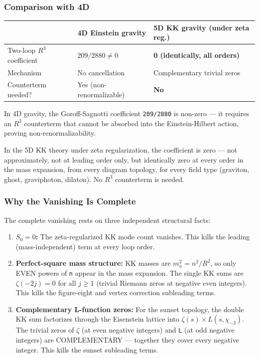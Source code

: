 \documentclass[aps,prd,preprint,superscriptaddress,longbibliography,floatfix]{revtex4-2}
\theoremstyle{remark}
\begin{document}
\subsubsection{Comparison with 4D}


\begin{table}[H]
\begin{ruledtabular}
\begin{tabular}{p{5.0cm}p{5.0cm}p{5.0cm}}
 & 4D Einstein gravity & 5D KK gravity (under zeta reg.) \\
\hline
Two-loop $R^{3}$ coefficient & $209/2880 \neq 0$ & \textbf{0 (identically, all orders)} \\
Mechanism & No cancellation & Complementary trivial zeros \\
Counterterm needed? & Yes (non-renormalizable) & \textbf{No} \\
\end{tabular}
\end{ruledtabular}
\end{table}

In 4D gravity, the Goroff-Sagnotti coefficient \texttt{209/2880} is non-zero --- it requires an $R^{3}$ counterterm that cannot be absorbed into the Einstein-Hilbert action, proving non-renormalizability.

In the 5D KK theory under zeta regularization, the coefficient is zero --- not approximately, not at leading order only, but identically zero at every order in the mass expansion, from every diagram topology, for every field type (graviton, ghost, graviphoton, dilaton). No $R^{3}$ counterterm is needed.


\subsubsection{Why the Vanishing Is Complete}

The complete vanishing rests on three independent structural facts:


\begin{enumerate}
  \item \textbf{$S_{0} = 0$:} The zeta-regularized KK mode count vanishes. This kills the leading (mass-independent) term at every loop order.
  \item \textbf{Perfect-square mass structure:} KK masses are $m_n^{2} = n^{2}/R^{2}$, so only EVEN powers of \texttt{n} appear in the mass expansion. The single KK sums are $\zeta(-2j) = 0$ for all $j \geq 1$ (trivial Riemann zeros at negative even integers). This kills the figure-eight and vertex correction subleading terms.
  \item \textbf{Complementary L-function zeros:} For the sunset topology, the double KK sum factorizes through the Eisenstein lattice into $\zeta(s) \times L(s, \chi_{-3})$. The trivial zeros of $\zeta$ (at even negative integers) and \texttt{L} (at odd negative integers) are COMPLEMENTARY --- together they cover every negative integer. This kills the sunset subleading terms.
\end{enumerate}
\end{document}
